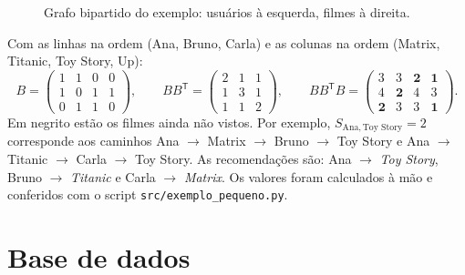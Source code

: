 \documentclass[12pt,a4paper]{article}
\theoremstyle{definition}
\begin{document}
\begin{figure}[ht]
\centering
{}
\caption{Grafo bipartido do exemplo: usuários à esquerda, filmes à direita.}
\label{fig:exemplo}
\end{figure}

Com as linhas na ordem (Ana, Bruno, Carla) e as colunas na ordem
(Matrix, Titanic, Toy Story, Up):
\[
  B = \begin{pmatrix}
    1 & 1 & 0 & 0\\
    1 & 0 & 1 & 1\\
    0 & 1 & 1 & 0
  \end{pmatrix},
  \qquad
  BB^{\mathsf T} = \begin{pmatrix}
    2 & 1 & 1\\
    1 & 3 & 1\\
    1 & 1 & 2
  \end{pmatrix},
  \qquad
  BB^{\mathsf T}B = \begin{pmatrix}
    3 & 3 & \mathbf{2} & \mathbf{1}\\
    4 & \mathbf{2} & 4 & 3\\
    \mathbf{2} & 3 & 3 & \mathbf{1}
  \end{pmatrix}.
\]
Em negrito estão os filmes ainda não vistos. Por exemplo,
$S_{\text{Ana},\,\text{Toy Story}} = 2$ corresponde aos caminhos
Ana $\to$ Matrix $\to$ Bruno $\to$ Toy Story e
Ana $\to$ Titanic $\to$ Carla $\to$ Toy Story. As recomendações são:
Ana $\to$ \emph{Toy Story}, Bruno $\to$ \emph{Titanic} e
Carla $\to$ \emph{Matrix}. Os valores foram calculados à mão e conferidos
com o script \texttt{src/exemplo\_pequeno.py}.

\section{Base de dados}\label{sec:base}
\end{document}
